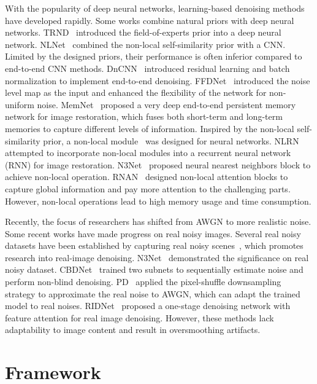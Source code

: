 \documentclass[runningheads]{llncs}
\begin{document}
With the popularity of deep neural networks, learning-based denoising methods have developed rapidly. Some works combine natural priors with deep neural networks. TRND~\cite{chen2016trainable} introduced the field-of-experts prior into a deep neural network. NLNet~\cite{lefkimmiatis2017non} combined the non-local self-similarity prior with a CNN. Limited by the designed priors, their performance is often inferior compared to end-to-end CNN methods. DnCNN~\cite{zhang2017beyond} introduced residual learning and batch normalization to implement end-to-end denoising. FFDNet~\cite{zhang2018ffdnet} introduced the noise level map as the input and enhanced the flexibility of the network for non-uniform noise. MemNet~\cite{tai2017memnet} proposed a very deep end-to-end persistent memory network for image restoration, which fuses both short-term and long-term memories to capture different levels of information. Inspired by the non-local self-similarity prior, a non-local module~\cite{wang2018non} was designed for neural networks. NLRN~\cite{liu2018non} attempted to incorporate non-local modules into a recurrent neural network (RNN) for image restoration. N3Net~\cite{Ploetz2018NNN} proposed neural nearest neighbors block to achieve non-local operation. RNAN~\cite{zhang2019residual} designed non-local attention blocks to capture global information and pay more attention to the challenging parts. However, non-local operations lead to high memory usage and time consumption. 

Recently, the focus of researchers has shifted from AWGN to more realistic noise. Some recent works have made progress on real noisy images. Several real noisy datasets have been established by capturing real noisy scenes~\cite{plotz2017benchmarking,anaya2018renoir,abdelhamed2018high}, which promotes research into real-image denoising. N3Net~\cite{Ploetz2018NNN} demonstrated the significance on real noisy dataset. CBDNet~\cite{guo2019toward} trained two subnets to sequentially estimate noise and perform non-blind denoising. PD~\cite{zhou2019awgn} applied the pixel-shuffle downsampling strategy to approximate the real noise to AWGN, which can adapt the trained model to real noises. RIDNet~\cite{anwar2019real} proposed a one-stage denoising network with feature attention for real image denoising. However, these methods lack adaptability to image content and result in oversmoothing artifacts.

\section{Framework}
\end{document}
